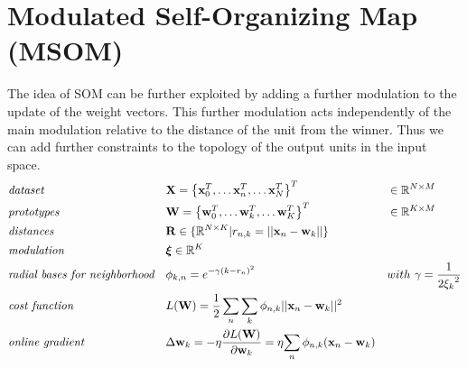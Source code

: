 \documentclass[a4paper]{article}
\begin{document}
\section*{Modulated Self-Organizing Map (MSOM)}
     The idea of SOM can be further exploited by adding a further modulation to the update of the weight vectors. This further modulation acts independently of the main modulation relative to the distance of the unit from the winner. Thus we can add further constraints to the topology of the output units in the input space.
\begin{align}
	& \emph{dataset} && 
    \mathbf{X} = \left\{\mathbf{x}^T_0, \dots\mathbf{x}^T_n, 
    \dots\mathbf{x}^T_N\right\}^T && 
    \in \mathbb{R}^{N\times M} \nonumber\\
	& \emph{prototypes} && 
    \mathbf{W}=\left\{\mathbf{w}^T_0, \dots\mathbf{w}^T_k, 
    \dots\mathbf{w}^T_K\right\}^T &&
    \in \mathbb{R}^{K \times M} \nonumber\\
 	& \emph{distances} &&  
    \mathbf{R}\in\{\mathbb{R}^{N\times K} | r_{n, k} =  || \mathbf{x}_n - \mathbf{w}_k ||\} && \nonumber\\
    & \emph{modulation} && 
    \boldsymbol{\xi} \in \mathbb{R}^{K} && \nonumber\\
    & \emph{radial bases for neighborhood} && 
    {\phi}_{k,n} = e^{{-\gamma (k- r_{n})^2}} && 
    with\ \gamma = \frac{1}{2{\xi_k}^2} \nonumber\\
    & \emph{cost function} &&
    L(\mathbf{W}) = \frac{1}{2}\sum_n\sum_k \phi_{n,k} 
    || \mathbf{x}_n - \mathbf{w}_k||^2  &&\nonumber\\
    & \emph{online gradient} && 
    \Delta{\mathbf{w}_{k}} = -\eta\frac{\partial L(\mathbf{W})}
    {\partial\mathbf{w}_{k}} = \eta{\sum_{n}{ \phi_{n,k} 
    (\mathbf{x}_n - \mathbf{w}_{k})}} &&\nonumber
\end{align}
\end{document}
